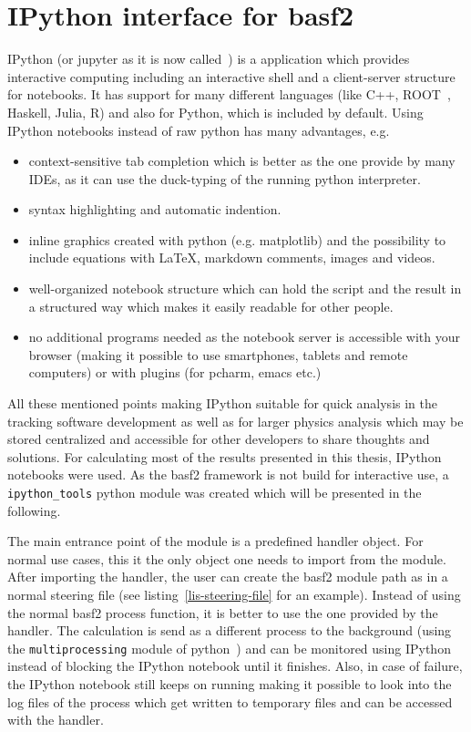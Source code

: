 \section{IPython interface for basf2}

IPython (or jupyter as it is now called~\cite{jupyter}) is a application which provides interactive computing including an interactive shell and a client-server structure for notebooks. It has support for many different languages (like C++, ROOT~\cite{root_ipython}, Haskell, Julia, R) and also for Python, which is included by default. Using IPython notebooks instead of raw python has many advantages, e.g.
\begin{itemize}
  \item context-sensitive tab completion which is better as the one provide by many IDEs, as it can use the duck-typing of the running python interpreter.
  \item syntax highlighting and automatic indention.
  \item inline graphics created with python (e.g. matplotlib) and the possibility to include equations with \LaTeX, markdown comments, images and videos.
  \item well-organized notebook structure which can hold the script and the result in a structured way which makes it easily readable for other people.
  \item no additional programs needed as the notebook server is accessible with your browser (making it possible to use smartphones, tablets and remote computers) or with plugins (for pcharm, emacs etc.)
\end{itemize}

All these mentioned points making IPython suitable for quick analysis in the tracking software development as well as for larger physics analysis which may be stored centralized and accessible for other developers to share thoughts and solutions. For calculating most of the results presented in this thesis, IPython notebooks were used. As the basf2 framework is not build for interactive use, a \texttt{ipython\_tools} python module was created which will be presented in the following.

The main entrance point of the module is a predefined handler object. For normal use cases, this it the only object one needs to import from the module. After importing the handler, the user can create the basf2 module path as in a normal steering file (see listing~\ref{lis-steering-file} for an example). Instead of using the normal basf2 process function, it is better to use the one provided by the handler. The calculation is send as a different process to the background (using the \texttt{multiprocessing} module of python~\cite{multiprocessing}) and can be monitored using IPython instead of blocking the IPython notebook until it finishes. Also, in case of failure, the IPython notebook still keeps on running making it possible to look into the log files of the process which get written to temporary files and can be accessed with the handler.

